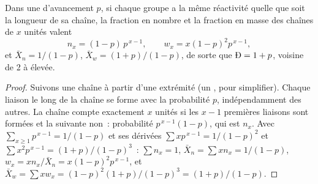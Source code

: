 \begin{theorem}\label{thm:b2:polymer-synthesis:flory}
Dans une  d'avancement $p$, si chaque groupe a la même réactivité quelle que soit
la longueur de sa chaîne, la fraction en nombre et la fraction en masse des chaînes de $x$ unités valent
\begin{equation*}
n_x = (1-p)\,p^{\,x-1}, \qquad w_x = x(1-p)^2 p^{\,x-1},
\end{equation*}
et $\bar X_n = 1/(1-p)$, $\bar X_w = (1+p)/(1-p)$, de sorte que $\text{\DH} = 1 + p$, voisine de 2 à
 élevée.
\end{theorem}

\begin{proof}
Suivons une chaîne à partir d'une extrémité (un  , pour simplifier). Chaque liaison le
long de la chaîne se forme avec la probabilité $p$, indépendamment des autres. La chaîne compte
exactement $x$ unités si les $x-1$ premières liaisons sont formées et la suivante non~: probabilité
$p^{\,x-1}(1-p)$, qui est $n_x$. Avec $\sum_{x\ge1} p^{\,x-1} =
1/(1-p)$ et ses dérivées $\sum x p^{\,x-1} = 1/(1-p)^2$ et $\sum x^2 p^{\,x-1} = (1+p)/(1-p)^3$~:
$\sum n_x = 1$, $\bar X_n = \sum x n_x = 1/(1-p)$, $w_x = x n_x/\bar X_n = x(1-p)^2p^{\,x-1}$, et
$\bar X_w = \sum x w_x = (1-p)^2(1+p)/(1-p)^3 = (1+p)/(1-p)$.
\end{proof}

